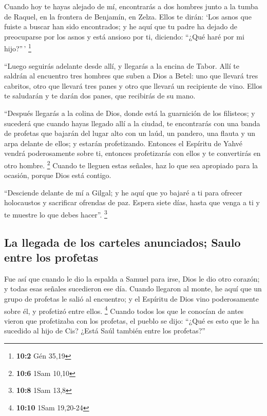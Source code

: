 \begin{paracol}{2}
 Cuando hoy te hayas alejado de mí, encontrarás a dos
hombres junto a la tumba de Raquel, en la frontera de Benjamín, en
Zelza. Ellos te dirán: `Los asnos que fuiste a buscar han sido
encontrados; y he aquí que tu padre ha dejado de preocuparse por los
asnos y está ansioso por ti, diciendo: ``¿Qué haré por mi hijo?''\,'
\footnote{\textbf{10:2} Gén 35,19}

 ``Luego seguirás adelante desde allí, y llegarás a la
encina de Tabor. Allí te saldrán al encuentro tres hombres que suben a
Dios a Betel: uno que llevará tres cabritos, otro que llevará tres panes
y otro que llevará un recipiente de vino.  Ellos te
saludarán y te darán dos panes, que recibirás de su mano.

 ``Después llegarás a la colina de Dios, donde está la
guarnición de los filisteos; y sucederá que cuando hayas llegado allí a
la ciudad, te encontrarás con una banda de profetas que bajarán del
lugar alto con un laúd, un pandero, una flauta y un arpa delante de
ellos; y estarán profetizando.  Entonces el Espíritu de
Yahvé vendrá poderosamente sobre ti, entonces profetizarás con ellos y
te convertirás en otro hombre. \footnote{\textbf{10:6} 1Sam 10,10}
 Cuando te lleguen estas señales, haz lo que sea apropiado
para la ocasión, porque Dios está contigo.

 ``Desciende delante de mí a Gilgal; y he aquí que yo
bajaré a ti para ofrecer holocaustos y sacrificar ofrendas de paz.
Espera siete días, hasta que venga a ti y te muestre lo que debes
hacer''. \footnote{\textbf{10:8} 1Sam 13,8}

\hypertarget{la-llegada-de-los-carteles-anunciados-saulo-entre-los-profetas}{%
\subsection{La llegada de los carteles anunciados; Saulo entre los
profetas}\label{la-llegada-de-los-carteles-anunciados-saulo-entre-los-profetas}}

 Fue así que cuando le dio la espalda a Samuel para irse,
Dios le dio otro corazón; y todas esas señales sucedieron ese día.
 Cuando llegaron al monte, he aquí que un grupo de
profetas le salió al encuentro; y el Espíritu de Dios vino poderosamente
sobre él, y profetizó entre ellos. \footnote{\textbf{10:10} 1Sam
  19,20-24}  Cuando todos los que le conocían de antes
vieron que profetizaba con los profetas, el pueblo se dijo: ``¿Qué es
esto que le ha sucedido al hijo de Cis? ¿Está Saúl también entre los
profetas?''


\end{paracol}
